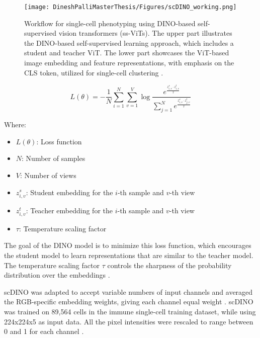 \documentclass[12pt,a4paper]{article}
\begin{document}
\begin{figure}
  \centering
  \texttt{[image: DineshPalliMasterThesis/Figures/scDINO\_working.png]}
  \caption[Workflow of scDINO]{Workflow for single-cell phenotyping using DINO-based self-supervised vision transformers (ss-ViTs). The upper part illustrates the DINO-based self-supervised learning approach, which includes a student and teacher ViT. The lower part showcases the ViT-based image embedding and feature representations, with emphasis on the CLS token, utilized for single-cell clustering \cite{Pfaendler2023.01.16.524226}.}
  \label{scdinoworking}
\end{figure}

$$
L(\theta) = -\frac{1}{N} \sum_{i=1}^{N} \sum_{v=1}^{V} \log \frac{e^{\frac{z_{i,v}^s \cdot z_{i,v}^t}{\tau}}}{\sum_{j=1}^{N} e^{\frac{z_{i,v}^s \cdot z_{j,v}^t}{\tau}}}
$$

Where:
\begin{itemize}
\item $L(\theta)$: Loss function
\item $N$: Number of samples
\item $V$: Number of views
\item $z_{i,v}^s$: Student embedding for the $i$-th sample and $v$-th view
\item $z_{i,v}^t$: Teacher embedding for the $i$-th sample and $v$-th view
\item $\tau$: Temperature scaling factor
\end{itemize}

The goal of the DINO model is to minimize this loss function, which encourages the student model to learn representations that are similar to the teacher model. The temperature scaling factor $\tau$ controls the sharpness of the probability distribution over the embeddings \cite{Pfaendler2023.01.16.524226}.

scDINO was adapted to accept variable numbers of input channels and averaged the RGB-specific embedding weights, giving each channel equal weight \cite{Pfaendler2023.01.16.524226}. scDINO was trained on 89,564 cells in the immune single-cell training dataset, while using 224x224x5 as input data. All the pixel intensities were rescaled to range between 0 and 1 for each channel \cite{Pfaendler2023.01.16.524226}.
\end{document}

